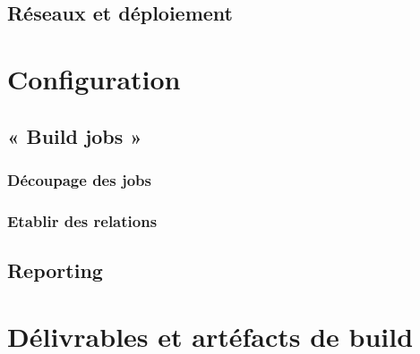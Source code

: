 \documentclass{report}
\begin{document}
        \subsection{Réseaux et déploiement}

      \section{Configuration}

        \subsection{« Build jobs »}

          \subsubsection{Découpage des jobs}

          \subsubsection{Etablir des relations}

        \subsection{Reporting}

      \section{Délivrables et artéfacts de build}

  \listoffigures                  %
\end{document}
